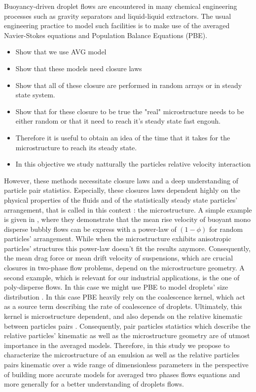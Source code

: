 Buoyancy-driven droplet flows are encountered in many chemical engineering processes such as gravity separators and liquid-liquid extractors. 
The usual engineering practice to model such facilities is to make use of the averaged Navier-Stokes equations and Population Balance Equations (PBE). 
\begin{itemize}
    \item Show that we use AVG model
    \item Show that these models need closure laws
    \item Show that all of these closure are performed in random arrays or in steady state system. 
    \item Show that for these closure to be true the "real" microstructure needs to be either random or that it need to reach it's steady state fast engouh. 
    \item Therefore it is useful to obtain an idea of the time that it takes for the microstructure to reach its steady state. 
    \item In this objective we study natturally the particles relative velocity interaction 
\end{itemize}
However, these methods necessitate closure laws and a deep understanding of particle pair statistics.
Especially, these closures laws dependent highly on the physical properties of the fluids and of the statistically steady state particles' arrangement, that is called in this context : the microstructure. 
A simple example is given in \citet{yin2008lattice}, where they demonstrate that the mean rise velocity of buoyant mono disperse bubbly flows can be express with a power-law of $(1-\phi)$ for random particles' arrangement.
While when the microstructure exhibits anisotropic particles' structures this power-law doesn't fit the results anymore.
Consequently, the mean drag force or mean drift velocity of suspensions, which are crucial closures in two-phase flow problems, depend on the microstructure geometry.  
A second example, which is relevant for our industrial applications, is the one of poly-disperse flows.
In this case we might use PBE to model droplets' size distribution \citep{randolph2012theory}.
In this case PBE heavily rely on the coalescence kernel, which act as a source term describing the rate of coalescence of droplets.   
Ultimately, this kernel is microstructure dependent, and also depends on the relative kinematic between particles pairs \citep{chesters1991modelling}. 
Consequently, pair particles statistics which describe the relative particles' kinematic as well as the microstructure geometry are of utmost importance in the averaged models. 
Therefore, in this study we propose to characterize the microstructure of an emulsion as well as the relative particles pairs kinematic over a wide range of dimensionless parameters in the perspective of building more accurate models for averaged two phases flows equations and more generally for a better understanding of droplets flows.


